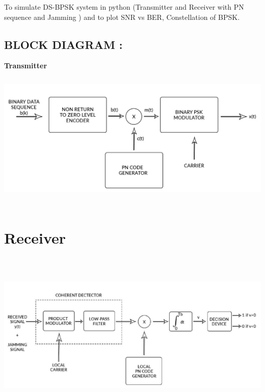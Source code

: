 \documentclass[a4paper,10pt]{article}
\begin{document}
\begin{Large}
\begin{center}
To simulate DS-BPSK system in python (Transmitter and Receiver with PN sequence  and Jamming ) and to plot SNR vs BER, Constellation of BPSK.
\end{center}
\end{Large}

\begin{flushleft}
\vspace*{1.5cm}
\section{\selectfont BLOCK DIAGRAM :}
\end{flushleft}


\begin{center}
\vspace*{1cm}
\large{\textbf{Transmitter}}
\vspace*{0.5cm}
\includegraphics[width=17cm, height=7cm]{Transmitter}\\
\section*{Receiver}
\includegraphics[width=17cm, height=8cm]{Receiver}\\
\end{center}
\end{document}
